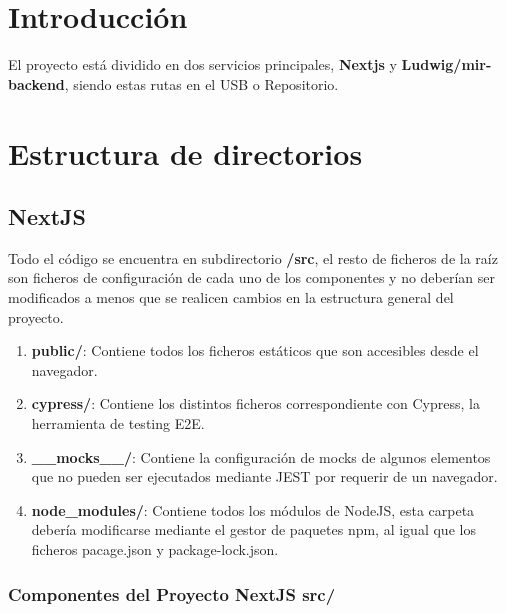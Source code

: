 
\section{Introducción}

El proyecto está dividido en dos servicios principales, \textbf{Nextjs} y \textbf{Ludwig/mir-backend}, siendo estas rutas en el USB o Repositorio.

\section{Estructura de directorios}

\subsection{NextJS}
Todo el código se encuentra en subdirectorio \textbf{/src}, el resto de ficheros de la raíz son ficheros de configuración de cada uno de los componentes y no deberían ser modificados a menos que se realicen cambios en la estructura general del proyecto. 
\begin{enumerate}
    \item \textbf{public/}: Contiene todos los ficheros estáticos que son accesibles desde el navegador. 
    \item \textbf{cypress/}: Contiene los distintos ficheros correspondiente con Cypress, la herramienta de testing E2E.
    \item \textbf{\_\_mocks\_\_/}: Contiene la configuración de mocks de algunos elementos que no pueden ser ejecutados mediante JEST por requerir de un navegador.
    \item \textbf{node\_modules/}: Contiene todos los módulos de NodeJS, esta carpeta debería modificarse mediante el gestor de paquetes npm, al igual que los ficheros pacage.json y package-lock.json.
\end{enumerate}

\subsubsection{Componentes del Proyecto NextJS src/}

